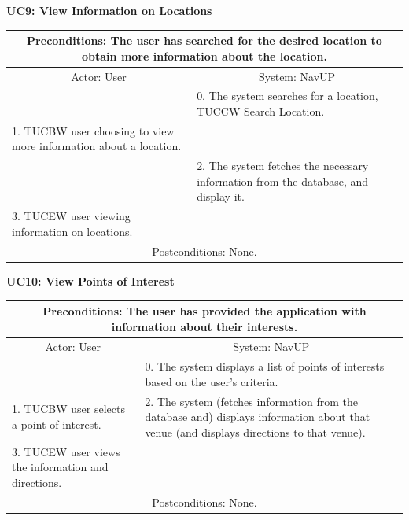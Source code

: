 \documentclass{article}
\begin{document}
				\vspace{5mm}
                \begin{flushleft}
                \textbf{UC9: View Information on Locations}\\
                \end{flushleft}
        		\centering	
       		 \small
       		 \begin{tabular}{|p{8cm}|p{8cm}|}
       		 \hline
       		 \multicolumn{2}{c}{Preconditions: The user has searched for the desired location to obtain more information about the location.} \\
       		 \hline
       		 \multicolumn{1}{c}{Actor: User} & \multicolumn{1}{c}{ System: NavUP} \\
        		\hline
       		& 0.	The system searches for a location, TUCCW Search Location.\\
       		 \hline
       		 1.	TUCBW user choosing to view more information about a location.\\  & 2.	The system fetches the necessary information from the database, and display it.\\
        		\hline
       		 3.	TUCEW user viewing information on locations. &\\
       		 \hline
        		\multicolumn{2}{c}{Postconditions: None.} \\
        		\hline
        \end{tabular} 
      
				\vspace{5mm}
                \begin{flushleft}
                \textbf{UC10: View Points of Interest}\\
                \end{flushleft}
        		\centering			
       		 \small
       		 \begin{tabular}{|p{8cm}|p{8cm}|}
       		 \hline
       		\multicolumn{2}{c}{ Preconditions: The user has provided the application with information about their interests.} \\
       		 \hline
       		\multicolumn{1}{c}{Actor: User} & \multicolumn{1}{c}{ System: NavUP} \\
        		\hline
       		 & 0.	The system displays a list of points of interests based on the user's criteria.\\
       		 \hline
       		 1.	TUCBW user selects a point of interest. & 2.	The system (fetches information from the database and) displays information about that venue (and displays directions to that venue).\\
        		\hline
       		 3.	TUCEW user views the information and directions. &\\
       		 \hline
        		\multicolumn{2}{c}{Postconditions: None.} \\
        		\hline
        \end{tabular} 
      
\end{document}
